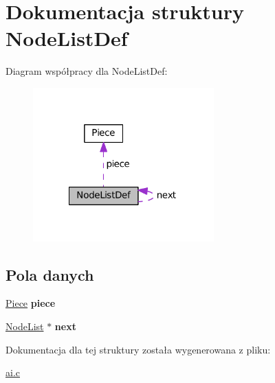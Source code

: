 \hypertarget{structNodeListDef}{\section{Dokumentacja struktury Node\-List\-Def}
\label{structNodeListDef}
}


Diagram współpracy dla Node\-List\-Def\-:
\nopagebreak
\begin{figure}[H]
\begin{center}
\leavevmode
\includegraphics[width=197pt]{structNodeListDef__coll__graph}
\end{center}
\end{figure}
\subsection*{Pola danych}
\begin{DoxyCompactItemize}
\item 
\hypertarget{structNodeListDef_ab95b95938c8b32e30344bfb3bd943fa4}{\hyperlink{structPiece}{Piece} {\bfseries piece}}\label{structNodeListDef_ab95b95938c8b32e30344bfb3bd943fa4}

\item 
\hypertarget{structNodeListDef_a1344e8e757b2a2c029f7fb59fc34cd09}{\hyperlink{structNodeListDef}{Node\-List} $\ast$ {\bfseries next}}\label{structNodeListDef_a1344e8e757b2a2c029f7fb59fc34cd09}

\end{DoxyCompactItemize}


Dokumentacja dla tej struktury została wygenerowana z pliku\-:\begin{DoxyCompactItemize}
\item 
\hyperlink{ai_8c}{ai.\-c}\end{DoxyCompactItemize}

